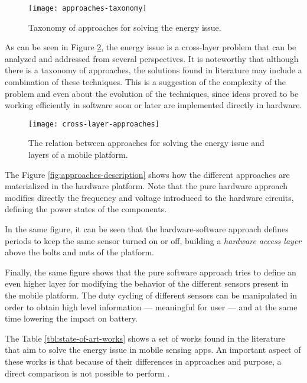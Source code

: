 \begin{figure}
\centering
\texttt{[image: approaches-taxonomy]}
\caption[Taxonomy of approaches for solving the energy issue]{Taxonomy of approaches for solving the energy issue.}
\label{fig:approaches-taxonomy}
\end{figure}

As can be seen in Figure \ref{fig:cross-layer-approaches}, the energy issue is a cross-layer problem that can be analyzed and addressed from several perspectives.
It is noteworthy that although there is a taxonomy of approaches, the solutions found in literature may include a combination of these techniques.
This is a suggestion of the complexity of the problem and even about the evolution of the techniques, since ideas proved to be working efficiently in software soon or later are implemented directly in hardware. 
\begin{figure}
\centering
\texttt{[image: cross-layer-approaches]}
\caption[Energy issue as an OS cross-platform problem]{The relation between approaches for solving the energy issue and layers of a mobile platform.}
\label{fig:cross-layer-approaches}
\end{figure}

The Figure \ref{fig:approaches-description} shows how the different approaches are materialized in the hardware platform. Note that the pure hardware approach modifies directly the frequency and voltage introduced to the hardware circuits, defining the power states of the components.

In the same figure, it can be seen that the hardware-software approach defines periods to keep the same sensor turned on or off, building a \emph{hardware access layer} above the bolts and nuts of the platform.

Finally, the same figure shows that the pure software approach tries to define an even higher layer for modifying the behavior of the different sensors present in the mobile platform. The duty cycling of different sensors can be manipulated in order to obtain high level information --- meaningful for user --- and at the same time lowering the impact on battery.

The Table \ref{tbl:state-of-art-works} shows a set of works found in the literature that aim to solve the energy issue in mobile sensing apps.
An important aspect of these works is that because of their differences in approaches and purpose, a direct comparison is not possible to perform \cite{Vallina-Rodriguez2013}.


